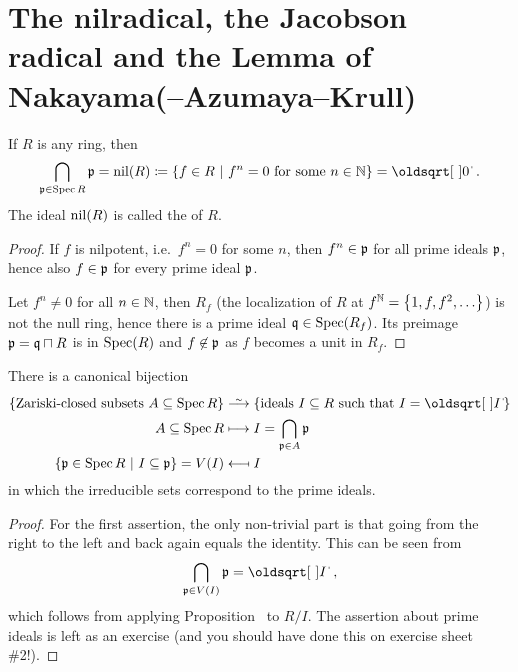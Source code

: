 \documentclass[a4paper,parskip=half,numbers=enddot, DIV=12]{scrreprt}
\begin{document}
\section{The nilradical, the Jacobson radical and the Lemma of Nakayama(--Azumaya--Krull)}

\begin{prop}
    If $R$ is any ring, then 
    \begin{align*}
    	\bigcap_{\pp\in\Spec R} \pp =\nil(R) \coloneqq \left\{f\in R\st f^n=0 \text{ for some } n\in\IN\right\} = \sqrt{0}\;.
    \end{align*}
    The ideal $\operatorname{nil}(R)$ is called the  of $R$.
\end{prop}
\begin{proof}
    If $f$ is nilpotent, i.e.\ $f^n=0$ for some $n$, then $f^n\in\mathfrak{p}$ for all prime ideals $\mathfrak{p}$, hence also $f\in\mathfrak{p}$ for every prime ideal $\mathfrak{p}$. 
    
    Let $f^n\neq 0$ for all $n\in \mathbb{N}$, then $R_f$ (the localization of $R$ at $f^{\mathbb{N}}=\left\{1,f,f^2,\ldots\right\}$) is not the null ring, hence there is a prime ideal $\mathfrak{q}\in\operatorname{Spec}(R_f)$. Its preimage $\mathfrak{p}=\mathfrak{q}\sqcap R$ is in $\operatorname{Spec}(R)$ and $f\not \in\mathfrak{p}$ as $f$ becomes a unit in $R_f$.
\end{proof}
\begin{cor}
    There is a canonical bijection 
    \begin{align*}
	    \left\{\text{Zariski-closed subsets }A\subseteq \Spec R\right\}&\isomorphism \left\{\text{ideals }I\subseteq R\text{ such that }I=\sqrt{I}\right\}\\
        A \subseteq \Spec R &\longmapsto I = \bigcap_{\pp\in A} \pp\\
        \left\{\pp\in \Spec R\st I\subseteq \pp\right\}=V(I)&\longmapsfrom I
    \end{align*}
    in which the irreducible sets correspond to the prime ideals.
\end{cor}
\begin{proof}
    For the first assertion, the only non-trivial part is that going from the right to the left and back again equals the identity. This can be seen from 
    \begin{align}\lbl{eq:PrimeCapRadical}
        \bigcap_{\pp\in V(I)}\pp = \sqrt{I}\;,
    \end{align}
    which follows from applying Proposition~ to $R/I$. The assertion about prime ideals is left as an exercise (and you should have done this on exercise sheet \#2!).
\end{proof}
\end{document}
